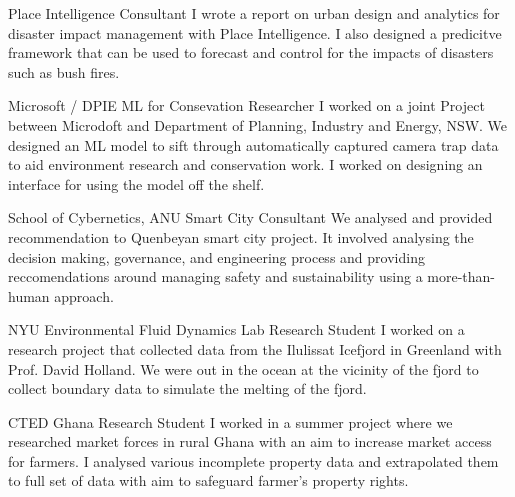 {Place Intelligence}
{Consultant}
{
	I wrote a report on urban design and analytics for disaster impact management with Place Intelligence. I also designed a predicitve framework that can be used to forecast and control for the impacts of disasters such as bush fires.
}

{Microsoft / DPIE}
{ML for Consevation Researcher}
{
	I worked on a joint Project between Microdoft and Department of Planning, Industry and Energy, NSW. We designed an ML model to sift through automatically captured camera trap data to aid environment research and conservation work. I worked on designing an interface for using the model off the shelf.
}

{School of Cybernetics, ANU}
{Smart City Consultant}
{
	We analysed and provided recommendation to Quenbeyan smart city project. It involved analysing the decision making, governance, and engineering process and providing reccomendations around managing safety and sustainability using a more-than-human approach.
}

{NYU Environmental Fluid Dynamics Lab}
{Research Student}
{
	I worked on a research project that collected data from the Ilulissat Icefjord in Greenland with Prof. David Holland. We were out in the ocean at the vicinity of the fjord to collect boundary data to simulate the melting of the fjord.
}

{CTED Ghana}
{Research Student}
{
	I worked in a summer project where we researched market forces in rural Ghana with an aim to increase market access for farmers. I analysed various incomplete property data and extrapolated them to full set of data with aim to safeguard farmer’s property rights.
}